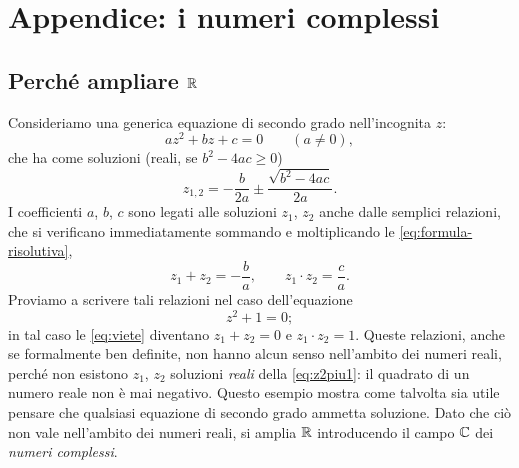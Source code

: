 \section{Appendice: i numeri complessi}
\label{sec:complessi}

\subsection{Perché ampliare \texorpdfstring{$\mathbb{R}$}{R}}

Consideriamo una generica equazione di secondo grado nell'incognita $z$:
\begin{equation}\label{eq:secondo-grado}
  az^{2}+bz+c=0 \qquad (a\neq0),
\end{equation}
che ha come soluzioni (reali, se $b^{2}-4ac\ge0$)
\begin{equation}\label{eq:formula-risolutiva}
  z_{1,2}=-\frac{b}{2a}\pm\frac{\sqrt{b^{2}-4ac}}{2a}.
\end{equation}
I coefficienti $a$, $b$, $c$ sono legati alle soluzioni $z_{1}$, $z_{2}$ anche dalle
semplici relazioni, che si verificano immediatamente sommando e moltiplicando le
\eqref{eq:formula-risolutiva},
\begin{equation}\label{eq:viete}
  z_{1}+z_{2}=-\frac ba, \qquad z_{1}\cdot z_{2}=\frac ca .
\end{equation}
Proviamo a scrivere tali relazioni nel caso dell'equazione
\begin{equation}\label{eq:z2piu1}
  z^{2}+1=0;
\end{equation}
in tal caso le \eqref{eq:viete} diventano $z_{1}+z_{2}=0$ e $z_{1}\cdot z_{2}=1$.
Queste relazioni, anche se formalmente ben definite, non hanno alcun senso nell'ambito
dei numeri reali, perché non esistono $z_{1}$, $z_{2}$ soluzioni \emph{reali} della
\eqref{eq:z2piu1}: il quadrato di un numero reale non è mai negativo. Questo esempio
mostra come talvolta sia utile pensare che qualsiasi equazione di secondo grado ammetta
soluzione. Dato che ciò non vale nell'ambito dei numeri reali, si amplia $\mathbb{R}$
introducendo il campo $\mathbb{C}$ dei \emph{numeri complessi}.

